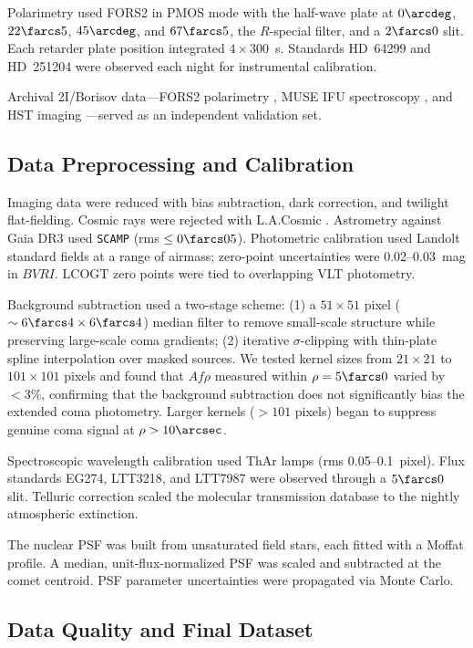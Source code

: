 \documentclass[preprint2]{aastex631}
\begin{document}
Polarimetry used FORS2 in PMOS mode with the half-wave plate at $0\arcdeg$, $22\farcs5$, $45\arcdeg$, and $67\farcs5$, the $R$-special filter, and a $2\farcs0$ slit. Each retarder plate position integrated $4 \times 300$~s. Standards HD~64299 and HD~251204 were observed each night for instrumental calibration.

Archival 2I/Borisov data---FORS2 polarimetry \citep{bagnulo22}, MUSE IFU spectroscopy \citep{opitom20}, and HST imaging \citep{jewitt20}---served as an independent validation set.

\subsection{Data Preprocessing and Calibration}

Imaging data were reduced with bias subtraction, dark correction, and twilight flat-fielding. Cosmic rays were rejected with L.A.Cosmic \citep{vandokkum01}. Astrometry against Gaia DR3 used \texttt{SCAMP} \citep{bertin06} (rms $\leq 0\farcs05$). Photometric calibration used Landolt standard fields at a range of airmass; zero-point uncertainties were 0.02--0.03~mag in $BVRI$. LCOGT zero points were tied to overlapping VLT photometry.

Background subtraction used a two-stage scheme: (1) a $51 \times 51$ pixel ($\sim 6\farcs4 \times 6\farcs4$) median filter to remove small-scale structure while preserving large-scale coma gradients; (2) iterative $\sigma$-clipping with thin-plate spline interpolation over masked sources. We tested kernel sizes from $21 \times 21$ to $101 \times 101$ pixels and found that $Af\rho$ measured within $\rho = 5\farcs0$ varied by $< 3\%$, confirming that the background subtraction does not significantly bias the extended coma photometry. Larger kernels ($> 101$ pixels) began to suppress genuine coma signal at $\rho > 10\arcsec$.

Spectroscopic wavelength calibration used ThAr lamps (rms 0.05--0.1~pixel). Flux standards EG274, LTT3218, and LTT7987 were observed through a $5\farcs0$ slit. Telluric correction scaled the molecular transmission database \citep{moehler14} to the nightly atmospheric extinction.

The nuclear PSF was built from unsaturated field stars, each fitted with a Moffat profile. A median, unit-flux-normalized PSF was scaled and subtracted at the comet centroid. PSF parameter uncertainties were propagated via Monte Carlo.

\subsection{Data Quality and Final Dataset}
\end{document}
